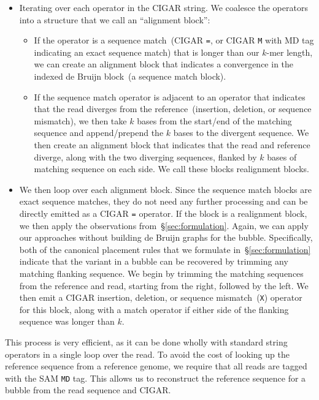 \documentclass{bioinfo}
\begin{document}
\begin{methods}
\begin{itemize}
\item Iterating over each operator in the CIGAR string. We coalesce the operators
into a structure that we call an ``alignment block'':
\begin{itemize}
\item If the operator is a sequence match~(CIGAR \texttt{=}, or CIGAR \texttt{M}
with MD tag indicating an exact sequence match) that is longer than our $k$-mer
length, we can create an alignment block that indicates a convergence in the
indexed de Bruijn block~(a sequence match block).
\item If the sequence match operator is adjacent to an operator that indicates
that the read diverges from the reference~(insertion, deletion, or sequence
mismatch), we then take $k$ bases from the start/end of the matching sequence
and append/prepend the $k$ bases to the divergent sequence. We then create an
alignment block that indicates that the read and reference diverge, along with
the two diverging sequences, flanked by $k$ bases of matching sequence on
each side. We call these blocks realignment blocks.
\end{itemize}
\item We then loop over each alignment block. Since the sequence match blocks
are exact sequence matches, they do not need any further processing and can be
directly emitted as a CIGAR \texttt{=} operator. If the block is a realignment
block, we then apply the observations from~\S\ref{sec:formulation}. Again, we
can apply our approaches without building de Bruijn graphs for the bubble.
Specifically, both of the canonical placement rules that we formulate
in~\S\ref{sec:formulation} indicate that the variant in a bubble can be recovered
by trimming any matching flanking sequence. We begin by trimming the matching
sequences from the reference and read, starting from the right, followed
by the left. We then emit a CIGAR insertion, deletion, or sequence
mismatch~(\texttt{X}) operator for this block, along with a match operator if
either side of the flanking sequence was longer than $k$.
\end{itemize}

This process is very efficient, as it can be done wholly with standard string
operators in a single loop over the read. To avoid the cost of looking up the
reference sequence from a reference genome, we require that all reads are
tagged with the SAM \texttt{MD} tag. This allows us to reconstruct the
reference sequence for a bubble from the read sequence and CIGAR.


\end{methods}
\end{document}
